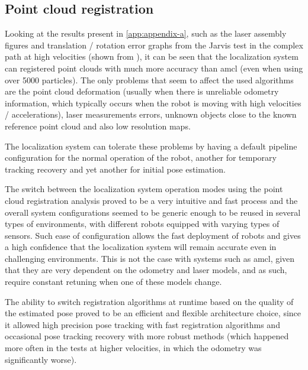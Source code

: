 \subsection{Point cloud registration}

Looking at the results present in \cref{app:appendix-a}, such as the laser assembly figures and translation / rotation error graphs from the Jarvis test in the complex path at high velocities (shown from ), it can be seen that the localization system can registered point clouds with much more accuracy than \gls{amcl} (even when using over 5000 particles). The only problems that seem to affect the used algorithms are the point cloud deformation (usually when there is unreliable odometry information, which typically occurs when the robot is moving with high velocities / accelerations), laser measurements errors, unknown objects close to the known reference point cloud and also low resolution maps.

The localization system can tolerate these problems by having a default pipeline configuration for the normal operation of the robot, another for temporary tracking recovery and yet another for initial pose estimation.

The switch between the localization system operation modes using the point cloud registration analysis proved to be a very intuitive and fast process and the overall system configurations seemed to be generic enough to be reused in several types of environments, with different robots equipped with varying types of sensors. Such ease of configuration allows the fast deployment of robots and gives a high confidence that the localization system will remain accurate even in challenging environments. This is not the case with systems such as \gls{amcl}, given that they are very dependent on the odometry and laser models, and as such, require constant retuning when one of these models change.

The ability to switch registration algorithms at runtime based on the quality of the estimated pose proved to be an efficient and flexible architecture choice, since it allowed high precision pose tracking with fast registration algorithms and occasional pose tracking recovery with more robust methods (which happened more often in the tests at higher velocities, in which the odometry was significantly worse).

